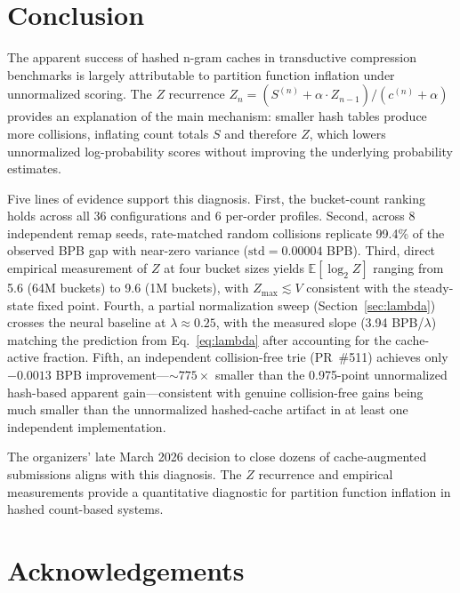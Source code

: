 \documentclass[11pt]{article}
\newcommand{\E}{\mathbb{E}}
\begin{document}
\section{Conclusion}

The apparent success of hashed n-gram caches in transductive compression benchmarks is largely attributable to partition function inflation under unnormalized scoring. The $Z$ recurrence $Z_n = (S^{(n)} + \alpha \cdot Z_{n-1})/(c^{(n)} + \alpha)$ provides an explanation of the main mechanism: smaller hash tables produce more collisions, inflating count totals $S$ and therefore $Z$, which lowers unnormalized log-probability scores without improving the underlying probability estimates.

Five lines of evidence support this diagnosis. First, the bucket-count ranking holds across all 36 configurations and 6 per-order profiles. Second, across 8 independent remap seeds, rate-matched random collisions replicate 99.4\% of the observed BPB gap with near-zero variance ($\text{std} = 0.00004$ BPB). Third, direct empirical measurement of $Z$ at four bucket sizes yields $\E[\log_2 Z]$ ranging from 5.6 (64M buckets) to 9.6 (1M buckets), with $Z_{\max} \lesssim V$ consistent with the steady-state fixed point. Fourth, a partial normalization sweep (Section~\ref{sec:lambda}) crosses the neural baseline at $\lambda \approx 0.25$, with the measured slope (3.94 BPB/$\lambda$) matching the prediction from Eq.~\ref{eq:lambda} after accounting for the cache-active fraction. Fifth, an independent collision-free trie (PR~\#511) achieves only $-0.0013$ BPB improvement---${\sim}775\times$ smaller than the 0.975-point unnormalized hash-based apparent gain---consistent with genuine collision-free gains being much smaller than the unnormalized hashed-cache artifact in at least one independent implementation.

The organizers' late March 2026 decision to close dozens of cache-augmented submissions aligns with this diagnosis. The $Z$ recurrence and empirical measurements provide a quantitative diagnostic for partition function inflation in hashed count-based systems.

\section*{Acknowledgements}
\end{document}
